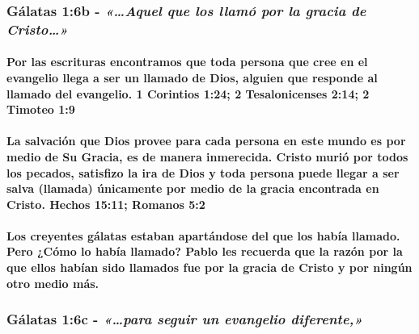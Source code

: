 \documentclass[11a pt,twoside]{article}
\newcommand{\scripture}[1]{%
  {\fontsize{12pt}{16pt}\selectfont\ScriptureFont\itshape #1}%
}
\let\oldsubsubsection\subsubsection
\renewcommand{\subsubsection}{\needspace{4\baselineskip}\oldsubsubsection}
\let\oldparagraph\paragraph
\renewcommand{\paragraph}{\needspace{3\baselineskip}\oldparagraph}
\begin{document}
\subsubsection{\texorpdfstring{Gálatas 1:6b -
\scripture{«…Aquel que los llamó por la gracia de Cristo…»}}{Gálatas 1:6b - }}\label{guxe1latas-16b---aquel-que-los-llamuxf3-por-la-gracia-de-cristo}

\paragraph{Por las escrituras encontramos que toda persona que cree en
el evangelio llega a ser un llamado de Dios, alguien que responde al
llamado del evangelio. 1 Corintios 1:24; 2 Tesalonicenses 2:14; 2
Timoteo
1:9}\label{por-las-escrituras-encontramos-que-toda-persona-que-cree-en-el-evangelio-llega-a-ser-un-llamado-de-dios-alguien-que-responde-al-llamado-del-evangelio.-1-corintios-124-2-tesalonicenses-214-2-timoteo-19}

\paragraph{La salvación que Dios provee para cada persona en este mundo
es por medio de Su Gracia, es de manera inmerecida. Cristo murió por
todos los pecados, satisfizo la ira de Dios y toda persona puede llegar
a ser salva (llamada) únicamente por medio de la gracia encontrada en
Cristo. Hechos 15:11; Romanos
5:2}\label{la-salvaciuxf3n-que-dios-provee-para-cada-persona-en-este-mundo-es-por-medio-de-su-gracia-es-de-manera-inmerecida.-cristo-muriuxf3-por-todos-los-pecados-satisfizo-la-ira-de-dios-y-toda-persona-puede-llegar-a-ser-salva-llamada-uxfanicamente-por-medio-de-la-gracia-encontrada-en-cristo.-hechos-1511-romanos-52}

\paragraph{Los creyentes gálatas estaban apartándose del que los había
llamado. Pero ¿Cómo lo había llamado? Pablo les recuerda que la razón
por la que ellos habían sido llamados fue por la gracia de Cristo y por
ningún otro medio
más.}\label{los-creyentes-guxe1latas-estaban-apartuxe1ndose-del-que-los-habuxeda-llamado.-pero-cuxf3mo-lo-habuxeda-llamado-pablo-les-recuerda-que-la-razuxf3n-por-la-que-ellos-habuxedan-sido-llamados-fue-por-la-gracia-de-cristo-y-por-ninguxfan-otro-medio-muxe1s.}

\subsubsection{\texorpdfstring{Gálatas 1:6c -
\scripture{«…para seguir un evangelio diferente,»}}{Gálatas 1:6c - }}\label{guxe1latas-16c---para-seguir-un-evangelio-diferente}
\end{document}
